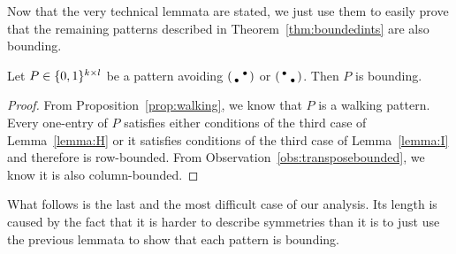 Now that the very technical lemmata are stated, we just use them to easily prove that the remaining patterns described in Theorem~\ref{thm:boundedints} are also bounding.

\begin{lemma}
\label{lemma:walkpat}
Let $P\in\{0,1\}^{k\times l}$ be a pattern avoiding $\left(\begin{smallmatrix} &\bullet\\\bullet& \end{smallmatrix}\right)$ or $\left(\begin{smallmatrix}\bullet& \\ &\bullet\end{smallmatrix}\right)$. Then $P$ is bounding.
\end{lemma}
\begin{proof}
From Proposition~\ref{prop:walking}, we know that $P$ is a walking pattern. Every one-entry of $P$ satisfies either conditions of the third case of Lemma~\ref{lemma:H} or it satisfies conditions of the third case of Lemma~\ref{lemma:I} and therefore is row-bounded. From Observation~\ref{obs:transposebounded}, we know it is also column-bounded.
\end{proof}

What follows is the last and the most difficult case of our analysis. Its length is caused by the fact that it is harder to describe symmetries than it is to just use the previous lemmata to show that each pattern is bounding.

